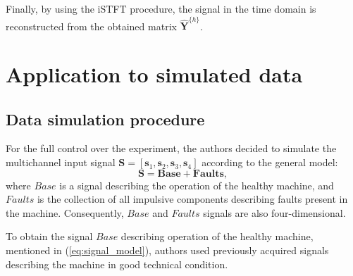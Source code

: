 \documentclass[3p,12pt]{elsarticle}
\begin{document}
Finally, by using the iSTFT procedure, the signal in the time domain is reconstructed from the obtained matrix $\mathbf{\widehat{Y}}^{\{h\}}$.

\section{Application to simulated data}

\subsection{Data simulation procedure}

For the full control over the experiment, the authors decided to simulate the multichannel input signal $\mathbf{S}=[\mathbf{s}_1,\mathbf{s}_2,\mathbf{s}_3,\mathbf{s}_4]$ according to the general model:
\begin{equation}
\label{eq:signal_model}
    \mathbf{S}=\mathbf{Base}+\mathbf{Faults},
\end{equation}
where $Base$ is a signal describing the operation of the healthy machine, and $Faults$ is the collection of all impulsive components describing faults present in the machine. Consequently, $Base$ and $Faults$ signals are also four-dimensional.

To obtain the signal $Base$ describing operation of the healthy machine, mentioned in (\ref{eq:signal_model}), authors used previously acquired signals describing the machine in good technical condition.


\end{document}
